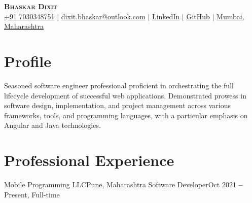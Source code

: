 \documentclass{resume}
\begin{document}

\begin{center}
    \textbf{\Huge \scshape Bhaskar Dixit} \\

    \small
    \faMobile \hspace{.5pt} \href{tel:917030348751}{+91 7030348751}
    $|$
    \faAt \hspace{.5pt} \href{mailto:dixit.bhaskar@outlook.com}{dixit.bhaskar@outlook.com}
    $|$
    \faLinkedinSquare \hspace{.5pt} \href{https://www.linkedin.com/in/bhaskar-dixit}{LinkedIn}
    $|$
    \faGithub \hspace{.5pt} \href{https://github.com/devBhaskar98}{GitHub}
    $|$
    \faMapMarker \hspace{.5pt} \href{https://maps.app.goo.gl/cxQaZHjSpMqCGx5s9}{Mumbai, Maharashtra}
\end{center}

\section{Profile}
{ Seasoned software engineer professional proficient in orchestrating the full lifecycle development of successful web applications. Demonstrated prowess in software design, implementation, and project management across various frameworks, tools, and programming languages, with a particular emphasis on Angular and Java technologies. }

\section{Professional Experience}
\vspace{3pt}

\resumeSubHeadingListStart
\resumeSubheading
      {Mobile Programming LLC}{Pune, Maharashtra}
      {Software Developer}{Oct 2021 \textbf{--} Present, Full-time}
\end{document}
